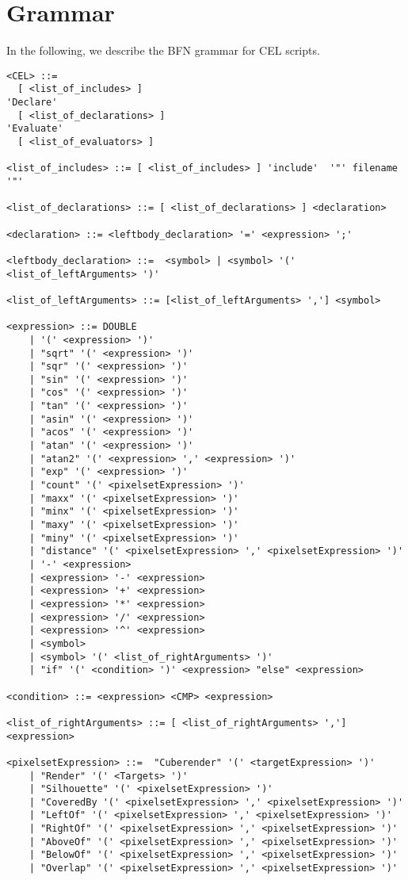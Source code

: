 \section{Grammar} \label{grammar}

In the following, we describe the BFN grammar for CEL scripts.

\begin{small}
\begin{verbatim}
<CEL> ::=
  [ <list_of_includes> ]
'Declare' 
  [ <list_of_declarations> ]
'Evaluate'
  [ <list_of_evaluators> ] 
  
<list_of_includes> ::= [ <list_of_includes> ] 'include'  '"' filename '"'

<list_of_declarations> ::= [ <list_of_declarations> ] <declaration>

<declaration> ::= <leftbody_declaration> '=' <expression> ';'

<leftbody_declaration> ::=  <symbol> | <symbol> '(' <list_of_leftArguments> ')'

<list_of_leftArguments> ::= [<list_of_leftArguments> ','] <symbol>

<expression> ::= DOUBLE 
    | '(' <expression> ')'
    | "sqrt" '(' <expression> ')' 
    | "sqr" '(' <expression> ')' 
    | "sin" '(' <expression> ')' 
    | "cos" '(' <expression> ')' 
    | "tan" '(' <expression> ')' 
    | "asin" '(' <expression> ')' 
    | "acos" '(' <expression> ')' 
    | "atan" '(' <expression> ')' 
    | "atan2" '(' <expression> ',' <expression> ')' 
    | "exp" '(' <expression> ')' 
    | "count" '(' <pixelsetExpression> ')'
    | "maxx" '(' <pixelsetExpression> ')'
    | "minx" '(' <pixelsetExpression> ')'
    | "maxy" '(' <pixelsetExpression> ')'
    | "miny" '(' <pixelsetExpression> ')'
    | "distance" '(' <pixelsetExpression> ',' <pixelsetExpression> ')'
    | '-' <expression> 
    | <expression> '-' <expression>
    | <expression> '+' <expression>    
    | <expression> '*' <expression>
    | <expression> '/' <expression>
    | <expression> '^' <expression>
    | <symbol>
    | <symbol> '(' <list_of_rightArguments> ')'
    | "if" '(' <condition> ')' <expression> "else" <expression> 

<condition> ::= <expression> <CMP> <expression> 
    
<list_of_rightArguments> ::= [ <list_of_rightArguments> ','] <expression>
        
<pixelsetExpression> ::=  "Cuberender" '(' <targetExpression> ')'         
    | "Render" '(' <Targets> ')'
    | "Silhouette" '(' <pixelsetExpression> ')'
    | "CoveredBy '(' <pixelsetExpression> ',' <pixelsetExpression> ')'
    | "LeftOf" '(' <pixelsetExpression> ',' <pixelsetExpression> ')'
    | "RightOf" '(' <pixelsetExpression> ',' <pixelsetExpression> ')'
    | "AboveOf" '(' <pixelsetExpression> ',' <pixelsetExpression> ')'
    | "BelowOf" '(' <pixelsetExpression> ',' <pixelsetExpression> ')'
    | "Overlap" '(' <pixelsetExpression> ',' <pixelsetExpression> ')'


\end{verbatim}
\end{small}
